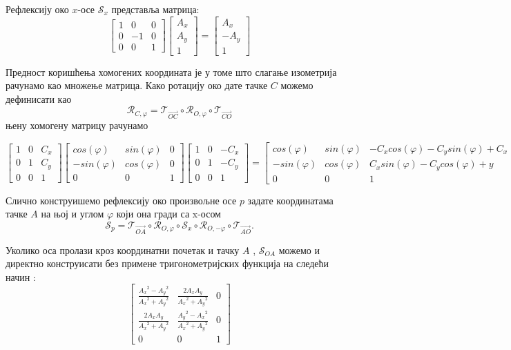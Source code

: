 \documentclass[12pt]{report}
\begin{document}
Рефлексију око $x$-осе $\mathcal{S}_x$  представља матрица:
\[\begin{bmatrix}1 & 0 & 0\\ 0 & -1&0 \\ 0 & 0 & 1\end{bmatrix} \begin{bmatrix}A_x\\ A_y\\1\end{bmatrix} = 
\begin{bmatrix}A_x \\ -A_y\\1\end{bmatrix}\]

Предност  коришћења  хомогених  координата  је  у  томе  што  слагање  изометрија  рачунамо  као множење матрица. Како ротацију око дате тачке $C$ можемо дефинисати као
$$\mathcal{R}_{C,\varphi} = \mathcal{T}_{\vec{OC}} \circ \mathcal{R}_{O,\varphi} \circ \mathcal{T}_{\vec{CO}}$$
њену хомогену матрицу рачунамо

\[\begin{bmatrix}1 & 0 & C_x\\ 0 & 1&C_y \\ 0 & 0 & 1\end{bmatrix}
\begin{bmatrix}cos(\varphi) & sin(\varphi) & 0\\ -sin(\varphi) & cos(\varphi)&0 \\ 0 & 0 & 1\end{bmatrix}
\begin{bmatrix}1 & 0 & -C_x\\ 0 & 1&-C_y \\ 0 & 0 & 1\end{bmatrix}
= 
\begin{bmatrix}cos(\varphi) & sin(\varphi) & -C_x cos(\varphi) - C_y sin(\varphi) + C_x\\ -sin(\varphi) & cos(\varphi)&C_x sin(\varphi) - C_y cos(\varphi) +y\\ 0 & 0 & 1\end{bmatrix}.\]

Слично конструишемо рефлексију око произвољне осе $p$ задате координатама тачке $A$ на њој и углом $\varphi$ који она гради са x-осом
$$\mathcal{S}_{p} = \mathcal{T}_{\vec{OA}} \circ \mathcal{R}_{O,\varphi} \circ \mathcal{S}_{x} \circ \mathcal{R}_{O,-\varphi} \circ \mathcal{T}_{\vec{AO}}.$$

Уколико оса пролази кроз координатни почетак и тачку $A$ , $\mathcal{S}_{OA}$ можемо и директно конструисати без примене тригонометријских функција на следећи начин :
\[\begin{bmatrix} \frac{{A_x}^2-{A_y}^2}{{A_x}^2+{A_y}^2} & \frac{2A_x A_y}{{A_x}^2+{A_y}^2} & 0\\ \frac{2A_x A_y}{{A_x}^2+{A_y}^2} & \frac{{A_y}^2-{A_x}^2}{{A_x}^2+{A_y}^2}&0 \\ 0 & 0 & 1\end{bmatrix} \]
\end{document}
